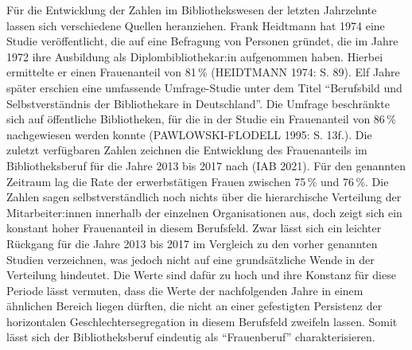 \documentclass[a4paper,
fontsize=11pt,
oneside,
numbers=noperiodatend,
parskip=half-,
bibliography=totoc,
final
]{scrartcl}
\begin{document}
Für die Entwicklung der Zahlen im Bibliothekswesen der letzten
Jahrzehnte lassen sich verschiedene Quellen heranziehen. Frank Heidtmann
hat 1974 eine Studie veröffentlicht, die auf eine Befragung von Personen
gründet, die im Jahre 1972 ihre Ausbildung als Diplombibliothekar:in
aufgenommen haben. Hierbei ermittelte er einen Frauenanteil von 81\,\%
(HEIDTMANN 1974: S. 89). Elf Jahre später erschien eine umfassende
Umfrage-Studie unter dem Titel \enquote{Berufsbild und Selbstverständnis
der Bibliothekare in Deutschland}. Die Umfrage beschränkte sich auf
öffentliche Bibliotheken, für die in der Studie ein Frauenanteil von
86\,\% nachgewiesen werden konnte (PAWLOWSKI-FLODELL 1995: S. 13f.). Die
zuletzt verfügbaren Zahlen zeichnen die Entwicklung des Frauenanteils im
Bibliotheksberuf für die Jahre 2013 bis 2017 nach (IAB 2021). Für den
genannten Zeitraum lag die Rate der erwerbstätigen Frauen zwischen 75\,\%
und 76\,\%. Die Zahlen sagen selbstverständlich noch nichts über die
hierarchische Verteilung der Mitarbeiter:innen innerhalb der einzelnen
Organisationen aus, doch zeigt sich ein konstant hoher Frauenanteil in
diesem Berufsfeld. Zwar lässt sich ein leichter Rückgang für die Jahre
2013 bis 2017 im Vergleich zu den vorher genannten Studien verzeichnen,
was jedoch nicht auf eine grundsätzliche Wende in der Verteilung
hindeutet. Die Werte sind dafür zu hoch und ihre Konstanz für diese
Periode lässt vermuten, dass die Werte der nachfolgenden Jahre in einem
ähnlichen Bereich liegen dürften, die nicht an einer gefestigten
Persistenz der horizontalen Geschlechtersegregation in diesem Berufsfeld
zweifeln lassen. Somit lässt sich der Bibliotheksberuf eindeutig als
\enquote{Frauenberuf} charakterisieren.
\end{document}
